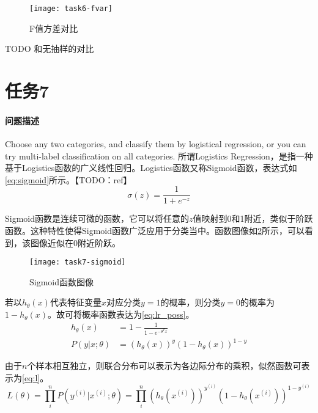 \documentclass[a4paper,12pt]{article}
\begin{document}
    \begin{figure}[htbp]
      \texttt{[image: task6-fvar]}
      \caption{F值方差对比}
      \label{fig:task6-fvar}
    \end{figure}

    TODO 和无抽样的对比

    \section{任务7} %
    \paragraph{问题描述} Choose any two categories, and classify them by logistical regression, or you can try multi-label classification on all categories.
    所谓Logistics Regression，是指一种基于Logistics函数的广义线性回归。Logistics函数又称Sigmoid函数，表达式如\cref{eq:sigmoid}所示。【TODO：ref】
    \begin{equation}
      \label{eq:sigmoid}
      \sigma(z) = \frac{1}{1+e^{-z}}
    \end{equation}

    Sigmoid函数是连续可微的函数，它可以将任意的$z$值映射到0和1附近，类似于阶跃函数。这种特性使得Sigmoid函数广泛应用于分类当中。函数图像如\cref{fig:sigmoid}所示，可以看到，该图像近似在0附近阶跃。
    \begin{figure}
      \texttt{[image: task7-sigmoid]}
      \caption{Sigmoid函数图像}
      \label{fig:sigmoid}
    \end{figure}

    若以$h_\theta(x)$代表特征变量$x$对应分类$y=1$的概率，则分类$y=0$的概率为$1-h_\theta(x)$。故可将概率函数表达为\cref{eq:lr_poss}。
    \begin{equation}
      \label{eq:lr_poss}
      \begin{aligned}
        h_\theta(x) &= 1-\frac{1}{1-e^{-\theta^T x}} \\
        P(y|x;\theta) &= (h_\theta(x))^y (1-h_\theta(x))^{1-y}
      \end{aligned}
    \end{equation}

    由于$n$个样本相互独立，则联合分布可以表示为各边际分布的乘积，似然函数可表示为\cref{eq:l}。
    \begin{equation}
      \label{eq:l}
      L(\theta) = \prod_{i}^n {P(y^{(i)}|x^{(i)};\theta)} = \prod_{i}^n {(h_\theta(x^{(i)}))^{y^{(i)}} (1-h_\theta(x^{(i)}))^{1-y^{(i)}}}
    \end{equation}
\end{document}
